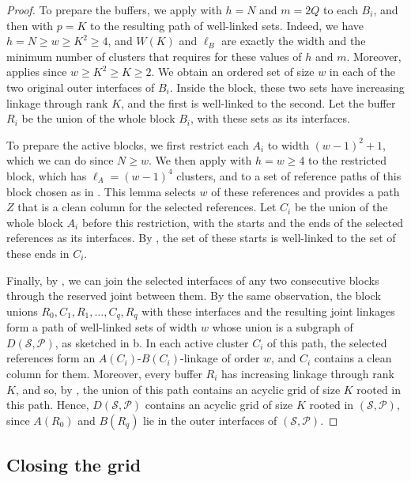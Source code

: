 \documentclass[fontsize=12pt,leading=14pt]{fullpaper}
\newcommand{\Pcal}{\mathcal{P}}
\newcommand{\Scal}{\mathcal{S}}
\begin{document}
\begin{proof}
  To prepare the buffers, we apply  with $h=N$ and $m=2Q$ to each $B_i$, and then  with $p=K$ to the resulting path of well-linked sets.
  Indeed, we have $h=N\ge w\ge K^2\ge4$, and $W(K)$ and $\ell_B$ are exactly the width and the minimum number of clusters that  requires for these values of $h$ and $m$.
  Moreover,  applies since $w\ge K^2\ge K\ge2$.
  We obtain an ordered set of size $w$ in each of the two original outer interfaces of $B_i$.
  Inside the block, these two sets have increasing linkage through rank $K$, and the first is well-linked to the second.
  Let the buffer $R_i$ be the union of the whole block $B_i$, with these sets as its interfaces.

  To prepare the active blocks, we first restrict each $A_i$ to width $(w-1)^2+1$, which we can do since $N\ge w$.
  We then apply  with $h=w\ge4$ to the restricted block, which has $\ell_A=(w-1)^4$ clusters, and to a set of reference paths of this block chosen as in .
  This lemma selects $w$ of these references and provides a path $Z$ that is a clean column for the selected references.
  Let $C_i$ be the union of the whole block $A_i$ before this restriction, with the starts and the ends of the selected references as its interfaces.
  By , the set of these starts is well-linked to the set of these ends in $C_i$.

  Finally, by , we can join the selected interfaces of any two consecutive blocks through the reserved joint between them.
  By the same observation, the block unions $R_0,C_1,R_1,\dots,C_q,R_q$ with these interfaces and the resulting joint linkages form a path of well-linked sets of width $w$ whose union is a subgraph of $D(\Scal,\Pcal)$, as sketched in b.
  In each active cluster $C_i$ of this path, the selected references form an $A(C_i)$-$B(C_i)$-linkage of order $w$, and $C_i$ contains a clean column for them.
  Moreover, every buffer $R_i$ has increasing linkage through rank $K$, and so, by , the union of this path contains an acyclic grid of size $K$ rooted in this path.
  Hence, $D(\Scal,\Pcal)$ contains an acyclic grid of size $K$ rooted in $(\Scal,\Pcal)$, since $A(R_0)$ and $B(R_q)$ lie in the outer interfaces of $(\Scal,\Pcal)$.
\end{proof}

\subsection{Closing the grid}\label{sec:s3-closing}
\end{document}
